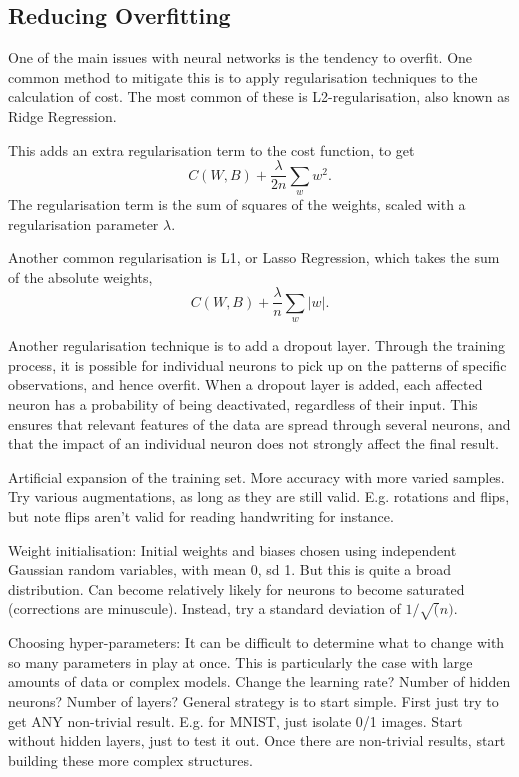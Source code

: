 \documentclass[honours,12pt]{unswthesis}
\numberwithin{equation}{section}
\begin{document}
\subsection{Reducing Overfitting}


One of the main issues with neural networks is the tendency to overfit. One common method to mitigate this is to apply regularisation techniques to the calculation of cost. The most common of these is L2-regularisation, also known as Ridge Regression.

This adds an extra regularisation term to the cost function, to get
\[
	C(W,B) + \dfrac{\lambda}{2n}\sum_{w}w^2.
\]
The regularisation term is the sum of squares of the weights, scaled with a regularisation parameter $\lambda$. 

Another common regularisation is L1, or Lasso Regression, which takes the sum of the absolute weights,
\[
	C(W,B) + \dfrac{\lambda}{n}\sum_w|w|.
\]

Another regularisation technique is to add a dropout layer. Through the training process, it is possible for individual neurons to pick up on the patterns of specific observations, and hence overfit. When a dropout layer is added, each affected neuron has a probability of being deactivated, regardless of their input. This ensures that relevant features of the data are spread through several neurons, and that the impact of an individual neuron does not strongly affect the final result.





Artificial expansion of the training set. More accuracy with more varied samples. Try various augmentations, as long as they are still valid. E.g. rotations and flips, but note flips aren't valid for reading handwriting for instance.

Weight initialisation: Initial weights and biases chosen using independent Gaussian random variables, with mean 0, sd 1. But this is quite a broad distribution. Can become relatively likely for neurons to become saturated (corrections are minuscule). Instead, try a standard deviation of $1/\sqrt(n)$.

Choosing hyper-parameters:
It can be difficult to determine what to change with so many parameters in play at once. This is particularly the case with large amounts of data or complex models. Change the learning rate? Number of hidden neurons? Number of layers? 
General strategy is to start simple. First just try to get ANY non-trivial result. E.g. for MNIST, just isolate 0/1 images. Start without hidden layers, just to test it out. Once there are non-trivial results, start building these more complex structures.
\end{document}
